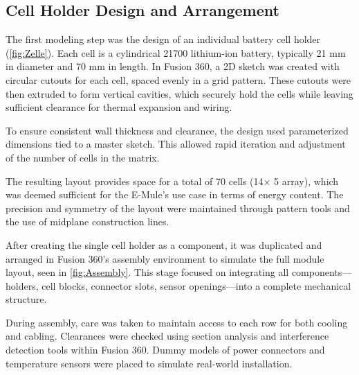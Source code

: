 \subsection{Cell Holder Design and Arrangement}

The first modeling step was the design of an individual battery cell holder (\ref{fig:Zelle}). Each cell is a cylindrical 21700 lithium-ion battery, typically 21 mm in diameter and 70 mm in length. In Fusion 360, a 2D sketch was created with circular cutouts for each cell, spaced evenly in a grid pattern. These cutouts were then extruded to form vertical cavities, which securely hold the cells while leaving sufficient clearance for thermal expansion and wiring.

To ensure consistent wall thickness and clearance, the design used parameterized dimensions tied to a master sketch. This allowed rapid iteration and adjustment of the number of cells in the matrix. 

The resulting layout provides space for a total of 70 cells (14× 5 array), which was deemed sufficient for the E-Mule’s use case in terms of energy content. The precision and symmetry of the layout were maintained through pattern tools and the use of midplane construction lines.


\addtocounter{page}{1}

After creating the single cell holder as a component, it was duplicated and arranged in Fusion 360’s assembly environment to simulate the full module layout, seen in \ref{fig:Assembly}. This stage focused on integrating all components—holders, cell blocks, connector slots, sensor openings—into a complete mechanical structure.


During assembly, care was taken to maintain access to each row for both cooling and cabling. Clearances were checked using section analysis and interference detection tools within Fusion 360. Dummy models of power connectors and temperature sensors were placed to simulate real-world installation.




